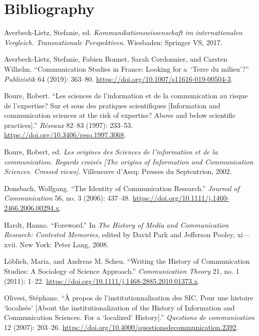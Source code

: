 \documentclass{tufte-handout}
\begin{document}
\section{Bibliography}\label{bibliography}

\begin{hangparas}{.25in}{1} 



Averbeck-Lietz, Stefanie, ed. \emph{Kommunikationswissenschaft im
internationalen Vergleich. Transnationale Perspektiven}. Wiesbaden:
Springer VS, 2017.

Averbeck-Lietz, Stefanie, Fabien Bonnet, Sarah Cordonnier, and Carsten
Wilhelm. ``Communication Studies in France: Looking for a~`Terre du
milieu'?'' \emph{Publizistik} 64 (2019): 363--80.
\url{https://doi.org/10.1007/s11616-019-00504-3}.

Boure, Robert. ``Les sciences de l'information et de la communication au
risque de l'expertise? Sur et sous des pratiques scientifiques
{[}Information and communication sciences at the risk of expertise?
Above and below scientific practices{]}.'' \emph{Réseaux} 82--83 (1997):
233--53. \url{https://doi.org/10.3406/reso.1997.3068}.

Boure, Robert, ed. \emph{Les origines des Sciences de l'information et
de la communication. Regards croisés {[}The origins of Information and
Communication Sciences. Crossed views{]}}. Villeneuve d'Ascq: Presses du
Septentrion, 2002.

Donsbach, Wolfgang. ``The Identity of Communication Research.''
\emph{Journal of Communication} 56, no. 3 (2006): 437--48.
\url{https://doi.org/10.1111/j.1460-2466.2006.00294.x}.

Hardt, Hanno. ``Foreword.'' In \emph{The History of Media and
Communication Research: Contested Memories}, edited by David Park and
Jefferson Pooley, xi---xvii. New York: Peter Lang, 2008.

Löblich, Maria, and Andreas M. Scheu. ``Writing the History of
Communication Studies: A Sociology of Science Approach.''
\emph{Communication Theory} 21, no. 1 (2011): 1--22.
\url{https://doi.org/10.1111/j.1468-2885.2010.01373.x}.

Olivesi, Stéphane. ``À propos de l'institutionnalisation des SIC. Pour
une histoire `localisée' {[}About the institutionalization of the
History of Information and Communication Sciences. For a `localized'
History{]}.'' \emph{Questions de communication} 12 (2007): 203--26.
\url{https://doi.org/10.4000/questionsdecommunication.2392}.


\end{hangparas}
\end{document}
